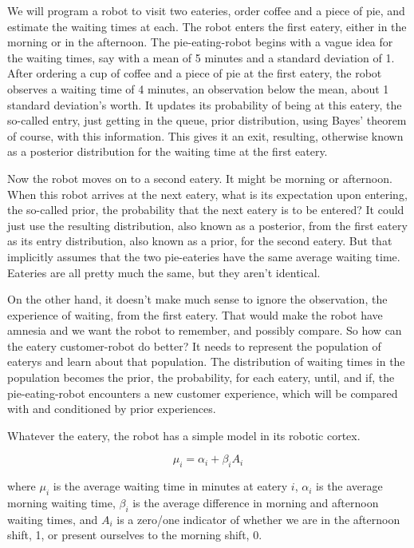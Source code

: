 \documentclass[
]{book}
\begin{document}
We will program a robot to visit two eateries, order coffee and a piece of pie, and
estimate the waiting times at each. The robot enters the first eatery, either in the morning or in the afternoon. The pie-eating-robot begins with a vague idea for the waiting times, say with a mean of 5 minutes and a standard deviation of 1. After ordering a cup of coffee and a piece of pie at the first eatery, the robot observes a waiting time of 4 minutes, an observation below the mean, about 1 standard deviation's worth. It updates its probability of being at this eatery, the so-called entry, just getting in the queue, prior distribution, using Bayes' theorem of course, with this information. This gives it an exit, resulting, otherwise known as a posterior distribution for the waiting time at the first eatery.

Now the robot moves on to a second eatery. It might be morning or afternoon. When this robot arrives at the next eatery, what is its expectation upon entering, the so-called prior, the probability that the next eatery is to be entered? It could just use the resulting distribution, also known as a posterior, from the first eatery as its entry distribution, also known as a prior, for the second eatery. But that implicitly assumes that the two pie-eateries have the same average waiting time. Eateries are all pretty much the same, but they aren't identical.

On the other hand, it doesn't make much sense to ignore the observation, the experience of waiting, from the first eatery. That would make the robot have amnesia and we want the robot to remember, and possibly compare. So how can the eatery customer-robot do better? It needs to represent the population of eaterys and learn about that population. The distribution of waiting times in the population becomes the prior, the probability, for each eatery, until, and if, the pie-eating-robot encounters a new customer experience, which will be compared with and conditioned by prior experiences.

Whatever the eatery, the robot has a simple model in its robotic cortex.

\[
\mu_{i} = \alpha_{i} + \beta_{i}A_i
\]

where \(\mu_i\) is the average waiting time in minutes at eatery \(i\), \(\alpha_i\) is the average morning waiting time, \(\beta_i\) is the average difference in morning and afternoon waiting times, and \(A_i\) is a zero/one indicator of whether we are in the afternoon shift, 1, or present ourselves to the morning shift, 0.
\end{document}
